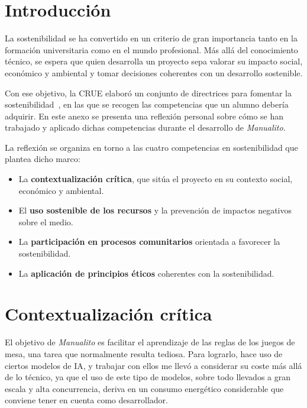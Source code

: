 
\section{Introducción}

La sostenibilidad se ha convertido en un criterio de gran importancia tanto en la
formación universitaria como en el mundo profesional. Más allá del conocimiento
técnico, se espera que quien desarrolla un proyecto sepa valorar su impacto
social, económico y ambiental y tomar decisiones coherentes con un desarrollo
sostenible.

Con ese objetivo, la \ac{CRUE} elaboró un conjunto de directrices para fomentar la sostenibilidad~\cite{crue_sostenibilidad},
en las que se recogen las competencias que un alumno debería adquirir. En este anexo se presenta una
reflexión personal sobre cómo se han trabajado y aplicado dichas competencias durante el desarrollo
de \textit{Manualito}.

La reflexión se organiza en torno a las cuatro competencias en sostenibilidad que plantea
dicho marco:
\begin{itemize}
    \item La \textbf{contextualización crítica}, que sitúa el proyecto en su
    contexto social, económico y ambiental.
    \item El \textbf{uso sostenible de los recursos} y la prevención de impactos
    negativos sobre el medio.
    \item La \textbf{participación en procesos comunitarios} orientada a favorecer la
    sostenibilidad.
    \item La \textbf{aplicación de principios éticos} coherentes con la
    sostenibilidad.
\end{itemize}

\section{Contextualización crítica}
El objetivo de \textit{Manualito} es facilitar el aprendizaje de las reglas de los juegos
de mesa, una tarea que normalmente resulta tediosa. Para lograrlo, hace uso de ciertos
modelos de \ac{IA}, y trabajar con ellos me llevó a considerar su coste más allá de lo técnico,
ya que el uso de este tipo de modelos, sobre todo llevados a gran escala y alta concurrencia,
deriva en un consumo energético considerable que conviene tener en cuenta como
desarrollador.


